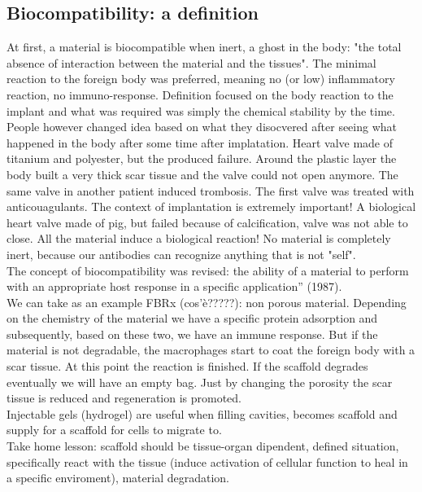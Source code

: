 \subsection{Biocompatibility: a definition}
At first, a material is biocompatible when inert, a ghost in the body: "the total absence of interaction between the material
and the tissues". The minimal reaction to the foreign body was preferred, meaning no (or low) inflammatory reaction, no immuno-response. Definition focused on the body reaction to the implant
and what was required was simply the chemical stability by the time.
\\
People however changed idea based on what they disocvered after seeing what happened in the body after some time after implatation. Heart valve made of titanium and polyester, but the produced failure. Around the plastic layer the body built a very thick scar tissue and the valve could not open anymore. The same valve in another patient induced trombosis. The first valve was treated with anticouagulants. The context of implantation is extremely important! A biological heart valve made of pig, but failed because of calcification, valve was not able to close. All the material induce a biological reaction! No material is completely inert, because our antibodies can recognize anything that is not "self".
\\
The concept of biocompatibility was revised: the ability of a material to perform with an appropriate host response in a specific application” (1987). 
\\
We can take as an example FBRx (cos'è?????): non porous material. Depending on the chemistry of the material we have a specific protein adsorption and subsequently, based on these two, we have an immune response. But if the material is not degradable, the macrophages start to coat the foreign body with a scar tissue. At this point the reaction is finished. If the scaffold degrades eventually we will have an empty bag. Just by changing the porosity the scar tissue is reduced and regeneration is promoted.
\\
Injectable gels (hydrogel) are useful when filling cavities, becomes scaffold and supply for a scaffold for cells to migrate to. 
\\
Take home lesson: scaffold should be tissue-organ dipendent, defined situation, specifically react with the tissue (induce activation of cellular function to heal in a specific enviroment), material degradation. 

